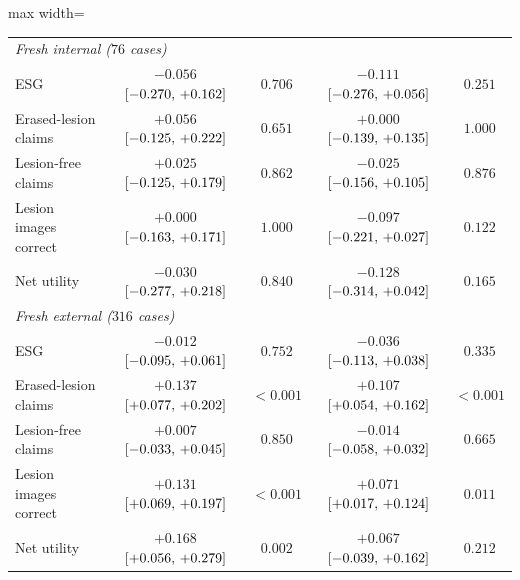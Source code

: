 \begin{table}[!htbp]
\begin{adjustbox}{max width=\linewidth}
\begin{tabular}{l cc cc}
\midrule
\multicolumn{5}{l}{\emph{Fresh internal ($76$ cases)}} \\
ESG & $-0.056$ $[-0.270,\,+0.162]$ & $0.706$ & $-0.111$ $[-0.276,\,+0.056]$ & $0.251$ \\
Erased-lesion claims & $+0.056$ $[-0.125,\,+0.222]$ & $0.651$ & $+0.000$ $[-0.139,\,+0.135]$ & $1.000$ \\
Lesion-free claims & $+0.025$ $[-0.125,\,+0.179]$ & $0.862$ & $-0.025$ $[-0.156,\,+0.105]$ & $0.876$ \\
Lesion images correct & $+0.000$ $[-0.163,\,+0.171]$ & $1.000$ & $-0.097$ $[-0.221,\,+0.027]$ & $0.122$ \\
Net utility & $-0.030$ $[-0.277,\,+0.218]$ & $0.840$ & $-0.128$ $[-0.314,\,+0.042]$ & $0.165$ \\
\midrule
\multicolumn{5}{l}{\emph{Fresh external ($316$ cases)}} \\
ESG & $-0.012$ $[-0.095,\,+0.061]$ & $0.752$ & $-0.036$ $[-0.113,\,+0.038]$ & $0.335$ \\
Erased-lesion claims & $+0.137$ $[+0.077,\,+0.202]$ & $<0.001$ & $+0.107$ $[+0.054,\,+0.162]$ & $<0.001$ \\
Lesion-free claims & $+0.007$ $[-0.033,\,+0.045]$ & $0.850$ & $-0.014$ $[-0.058,\,+0.032]$ & $0.665$ \\
Lesion images correct & $+0.131$ $[+0.069,\,+0.197]$ & $<0.001$ & $+0.071$ $[+0.017,\,+0.124]$ & $0.011$ \\
Net utility & $+0.168$ $[+0.056,\,+0.279]$ & $0.002$ & $+0.067$ $[-0.039,\,+0.162]$ & $0.212$ \\
\bottomrule
\end{tabular}
\end{adjustbox}
\end{table}

